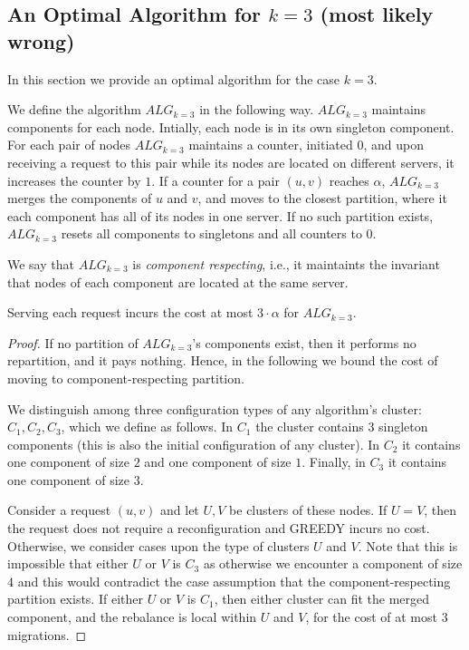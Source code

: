 \documentclass[manuscript,screen=true]{acmart}
\newcommand{\TAlg}{{\ensuremath{ALG_{k=3}}}\xspace} %
\newcommand\maciek[1]{\color{brown}\textbf{\\ Maciek: #1}\color{black}}
\begin{document}
\begin{appendix}
  \section{An Optimal Algorithm for $k=3$ (most likely wrong)}

  In this section we provide an optimal algorithm for the case $k=3$.
  
  We define the algorithm \TAlg in the following way.
  \TAlg maintains components for each node.
  Intially, each node is in its own singleton component.
  For each pair of nodes \TAlg maintains a counter, initiated $0$, and upon receiving a request to this pair while its nodes are located on different servers, it increases the counter by $1$.
  If a counter for a pair $(u,v)$ reaches $\alpha$, \TAlg merges the components of $u$ and $v$, and moves to the closest partition, where it each component has all of its nodes in one server.
  If no such partition exists, \TAlg resets all components to singletons and all counters to $0$.


  We say that \TAlg is \emph{component respecting}, i.e., it maintaints the invariant that nodes of each component are located at the same server.

  
  \begin{lemma}
    \label{lem:1req}
    Serving each request incurs the cost at most $3\cdot\alpha$ for \TAlg.
  \end{lemma}
  
  \begin{proof}
    If no partition of \TAlg's components exist, then it performs no repartition, and it pays nothing.
    Hence, in the following we bound the cost of moving to component-respecting partition.
  
    We distinguish among three configuration types of any algorithm's cluster: $C_1, C_2, C_3$, which we define as follows. In $C_1$ the cluster contains $3$ singleton components (this is also the initial configuration of any cluster). In $C_2$ it contains one component of size $2$ and one component of size $1$. Finally, in $C_3$ it contains one component of size $3$.
    
      Consider a request $(u, v)$ and let $U, V$ be clusters of these nodes.
      If $U=V$, then the request does not require a reconfiguration and GREEDY incurs no cost.
      Otherwise, we consider cases upon the type of clusters $U$ and $V$.
      Note that this is impossible that either $U$ or $V$ is $C_3$ as otherwise we encounter a component of size $4$ and this would contradict the case assumption that the component-respecting partition exists.
      If either $U$ or $V$ is $C_1$, then either cluster can fit the merged component, and the rebalance is local within $U$ and $V$, for the cost of at most $3$ migrations.
    

\end{proof}
\end{appendix}
\end{document}
